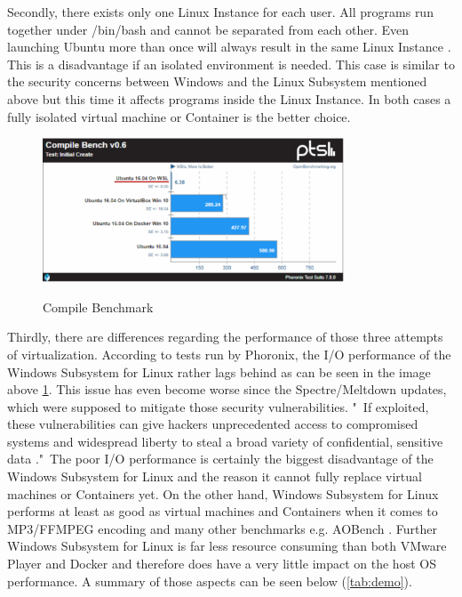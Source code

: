 \documentclass[utf8,biblatex, ngerman, english]{lni}
\begin{document}
Secondly, there exists only one Linux Instance for each user. All programs run together under /bin/bash and cannot be separated from each other. Even launching Ubuntu more than once will always result in the same Linux Instance \cite{Ha16b}. This is a disadvantage if an isolated environment is needed. This case is similar to the security concerns between Windows and the Linux Subsystem mentioned above but this time it affects programs inside the Linux Instance. In both cases a fully isolated virtual machine or 
Container is the better choice.

\begin{figure}
  \centering
  \includegraphics[width=0.8\textwidth]{CompileSpeed.pdf}
  \caption{Compile Benchmark} \cite{La18} 
  \label{img:speed}
\end{figure}

Thirdly, there are differences regarding the performance of those three attempts of virtualization. According to tests run by Phoronix, the I/O performance of the Windows Subsystem for Linux rather lags behind as can be seen in the image above \ref{img:speed}. This issue has even become worse since the Spectre/Meltdown updates, which were supposed to mitigate those security vulnerabilities. "\ If exploited, these vulnerabilities can give hackers unprecedented access to compromised systems and widespread liberty to steal a broad variety of confidential, sensitive data \cite{Pe18}."\ The poor I/O performance is certainly the biggest disadvantage of the Windows Subsystem for Linux and the reason it cannot fully replace virtual machines or Containers yet. On the other hand, Windows Subsystem for Linux performs at least as good as virtual machines and Containers when it comes to MP3/FFMPEG encoding and many other benchmarks e.g. AOBench \cite{La18}. Further Windows Subsystem for Linux is far less resource consuming than both VMware Player and Docker and therefore does have a very little impact on the host OS performance. A summary of those aspects can be seen below (\ref{tab:demo}).
\end{document}
